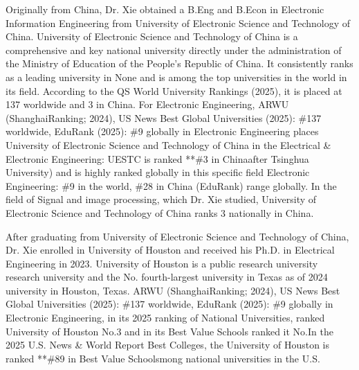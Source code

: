 \documentclass{article}
\begin{document}
Originally from China, Dr. Xie obtained a B.Eng and B.Econ in Electronic Information Engineering from University of Electronic Science and Technology of China. University of Electronic Science and Technology of China is a comprehensive and key national university directly under the administration of the Ministry of Education of the People's Republic of China. It consistently ranks as a leading university in None and is among the top universities in the world in its field. According to the QS World University Rankings (2025), it is placed at 137 worldwide and 3 in China. For Electronic Engineering, ARWU (ShanghaiRanking; 2024), US News Best Global Universities (2025): \#137 worldwide, EduRank (2025): \#9 globally in Electronic Engineering places University of Electronic Science and Technology of China in the Electrical \& Electronic Engineering: UESTC is ranked **\#3 in Chinaafter Tsinghua University) and is highly ranked globally in this specific field Electronic Engineering: \#9 in the world, \#28 in China (EduRank) range globally. In the field of Signal and image processing, which Dr. Xie studied, University of Electronic Science and Technology of China ranks 3 nationally in China.

After graduating from University of Electronic Science and Technology of China, Dr. Xie enrolled in University of Houston and received his Ph.D. in Electrical Engineering in 2023. University of Houston is a  public research university research university and the No. fourth-largest university in Texas as of 2024 university in Houston, Texas. ARWU (ShanghaiRanking; 2024), US News Best Global Universities (2025): \#137 worldwide, EduRank (2025): \#9 globally in Electronic Engineering, in its 2025 ranking of National Universities, ranked University of Houston No.3 and in its Best Value Schools ranked it No.In the 2025 U.S. News \& World Report Best Colleges, the University of Houston is ranked **\#89 in Best Value Schoolsmong national universities in the U.S.
\end{document}
